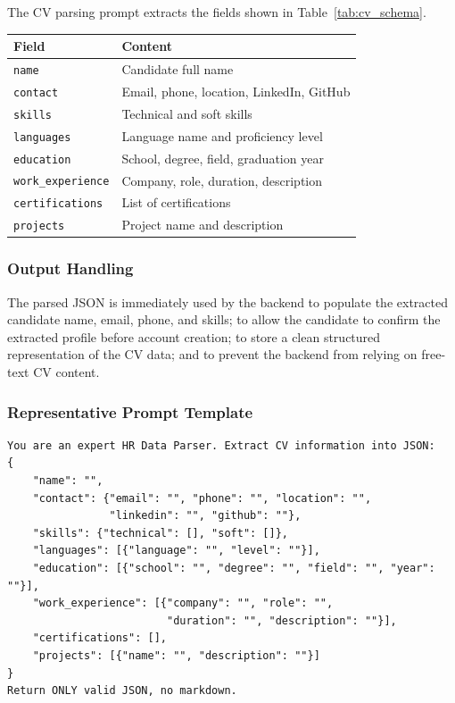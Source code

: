 The CV parsing prompt extracts the fields shown in Table~\ref{tab:cv_schema}.

\begin{center}
\label{tab:cv_schema}
\renewcommand{\arraystretch}{0.8}
\begin{tabularx}{\textwidth}{|l|l|}
\hline
\rowcolor{gray!20} \textbf{Field} & \textbf{Content} \\
\hline
\texttt{name} & Candidate full name \\
\hline
\texttt{contact} & Email, phone, location, LinkedIn, GitHub \\
\hline
\texttt{skills} & Technical and soft skills \\
\hline
\texttt{languages} & Language name and proficiency level \\
\hline
\texttt{education} & School, degree, field, graduation year \\
\hline
\texttt{work\_experience} & Company, role, duration, description \\
\hline
\texttt{certifications} & List of certifications \\
\hline
\texttt{projects} & Project name and description \\
\hline
\end{tabularx}
\end{center}

\subsubsection{Output Handling}

The parsed JSON is immediately used by the backend to populate the extracted candidate name, email, phone, and skills; to allow the candidate to confirm the extracted profile before account creation; to store a clean structured representation of the CV data; and to prevent the backend from relying on free-text CV content.

\subsubsection{Representative Prompt Template}

\begin{verbatim}
You are an expert HR Data Parser. Extract CV information into JSON:
{
    "name": "",
    "contact": {"email": "", "phone": "", "location": "",
                "linkedin": "", "github": ""},
    "skills": {"technical": [], "soft": []},
    "languages": [{"language": "", "level": ""}],
    "education": [{"school": "", "degree": "", "field": "", "year": ""}],
    "work_experience": [{"company": "", "role": "",
                         "duration": "", "description": ""}],
    "certifications": [],
    "projects": [{"name": "", "description": ""}]
}
Return ONLY valid JSON, no markdown.
\end{verbatim}

